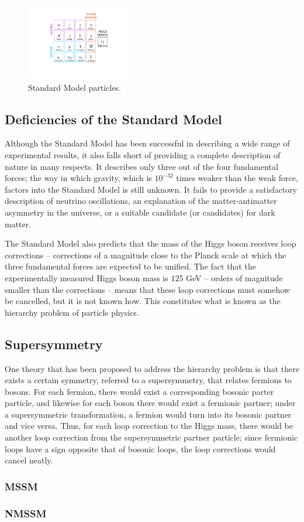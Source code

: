 \begin{figure}
   \begin{center}
      \includegraphics[width=0.4\textwidth]{figures/StandardModelTable}
      \caption{Standard Model particles.}
      \label{fig:StandardModelTable}
   \end{center}
\end{figure}

\subsection{Deficiencies of the Standard Model\label{sec:SMdeficiencies}}


Although the Standard Model has been successful in describing a wide range of experimental results, it also falls short of providing a complete description of nature in many respects. It describes only three out of the four fundamental forces; the way in which gravity, which is $10^{-32}$ times weaker than the weak force, factors into the Standard Model is still unknown. It fails to provide a satisfactory description of neutrino oscillations, an explanation of the matter-antimatter asymmetry in the universe, or a suitable candidate (or candidates) for dark matter.

The Standard Model also predicts that the mass of the Higgs boson receives loop corrections -- corrections of a magnitude close to the Planck scale at which the three fundamental forces are expected to be unified. The fact that the experimentally measured Higgs boson mass is 125 GeV -- orders of magnitude smaller than the corrections -- means that these loop corrections must somehow be cancelled, but it is not known how. This constitutes what is known as the hierarchy problem of particle physics.

\subsection{Supersymmetry}

One theory that has been proposed to address the hierarchy problem is that there exists a certain symmetry, referred to a supersymmetry, that relates fermions to bosons. For each fermion, there would exist a corresponding bosonic parter particle, and likewise for each boson there would exist a fermionic partner; under a supersymmetric transformation, a fermion would turn into its bosonic partner and vice versa. Thus, for each loop correction to the Higgs mass, there would be another loop correction from the supersymmetric partner particle; since fermionic loops have a sign opposite that of bosonic loops, the loop corrections would cancel neatly.

\subsubsection{MSSM}

\subsubsection{NMSSM}

